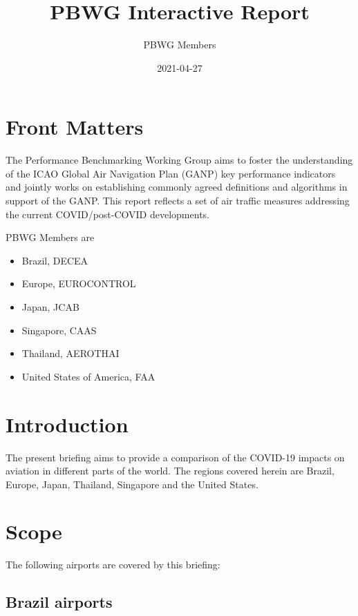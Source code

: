 \documentclass[
]{book}
\title{PBWG Interactive Report}
\author{PBWG Members}
\date{2021-04-27}
\providecommand{\tightlist}{%
  \setlength{\itemsep}{0pt}\setlength{\parskip}{0pt}}
\begin{document}
\maketitle

{
\setcounter{tocdepth}{1}
\tableofcontents
}
\hypertarget{front-matters}{%
\chapter*{Front Matters}\label{front-matters}}

The Performance Benchmarking Working Group aims to foster the understanding of the ICAO Global Air Navigation Plan (GANP) key performance indicators and jointly works on establishing commonly agreed definitions and algorithms in support of the GANP.
This report reflects a set of air traffic measures addressing the current COVID/post-COVID developments.

PBWG Members are

\begin{itemize}
\tightlist
\item
  Brazil, DECEA
\item
  Europe, EUROCONTROL
\item
  Japan, JCAB
\item
  Singapore, CAAS
\item
  Thailand, AEROTHAI
\item
  United States of America, FAA
\end{itemize}

\hypertarget{introduction}{%
\chapter{Introduction}\label{introduction}}

The present briefing aims to provide a comparison of the COVID-19 impacts on aviation in different parts of the world. The regions covered herein are Brazil, Europe, Japan, Thailand, Singapore and the United States.

\hypertarget{scope}{%
\chapter{Scope}\label{scope}}

The following airports are covered by this briefing:

\hypertarget{brazil-airports}{%
\section{Brazil airports}\label{brazil-airports}}
\end{document}
